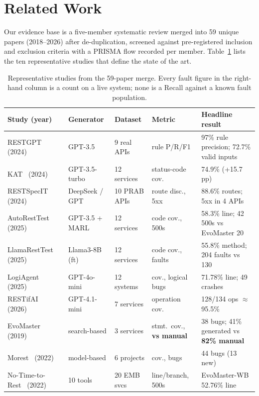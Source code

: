 \section{Related Work}
\label{sec:related}

Our evidence base is a five-member systematic review merged into 59 unique papers
(2018--2026) after de-duplication, screened against pre-registered inclusion and exclusion
criteria with a PRISMA flow recorded per member. Table~\ref{tab:related} lists the ten
representative studies that define the state of the art.

\begin{table}[tb]
\centering
\caption{Representative studies from the 59-paper merge. Every fault figure in the
right-hand column is a count on a live system; none is a Recall against a known fault
population.}
\label{tab:related}
\footnotesize
\setlength{\tabcolsep}{3pt}
\begin{tabular}{@{}p{2.8cm}p{1.6cm}p{1.4cm}p{1.7cm}p{3.85cm}@{}}
\toprule
\textbf{Study (year)} & \textbf{Generator} & \textbf{Dataset} & \textbf{Metric} & \textbf{Headline result} \\
\midrule
RESTGPT~\cite{restgpt} (2024)      & GPT-3.5              & 9 real APIs   & rule P/R/F1        & 97\% rule precision; 72.7\% valid inputs \\
KAT~\cite{kat} (2024)              & GPT-3.5-turbo        & 12 services   & status-code cov.\  & 74.9\% (+15.7\,pp) \\
RESTSpecIT~\cite{restspecit} (2024)& DeepSeek / GPT       & 10 PRAB APIs  & route disc., 5xx   & 88.6\% routes; 5xx in 4 APIs \\
AutoRestTest~\cite{autoresttest} (2025) & GPT-3.5 + MARL  & 12 services   & code cov., 500s    & 58.3\% line; 42 500s vs EvoMaster 20 \\
LlamaRestTest~\cite{llamaresttest} (2025) & Llama3-8B (ft) & 12 services  & code cov., faults  & 55.8\% method; 204 faults vs 130 \\
LogiAgent~\cite{logiagent} (2025)  & GPT-4o-mini          & 12 systems    & cov., logical bugs & 71.78\% line; 49 crashes \\
RESTifAI~\cite{restifai} (2026)    & GPT-4.1-mini         & 7 services    & operation cov.\    & 128/134 ops $\approx$ 95.5\% \\
EvoMaster~\cite{evomaster} (2019)  & search-based         & 3 services    & stmt.\ cov., \textbf{vs manual} & 38 bugs; 41\% generated vs \textbf{82\% manual} \\
Morest~\cite{morest} (2022)        & model-based          & 6 projects    & cov., bugs         & 44 bugs (13 new) \\
No-Time-to-Rest~\cite{notimetorest} (2022) & 10 tools     & 20 EMB svcs   & line/branch, 500s  & EvoMaster-WB 52.76\% line \\
\bottomrule
\end{tabular}
\end{table}


